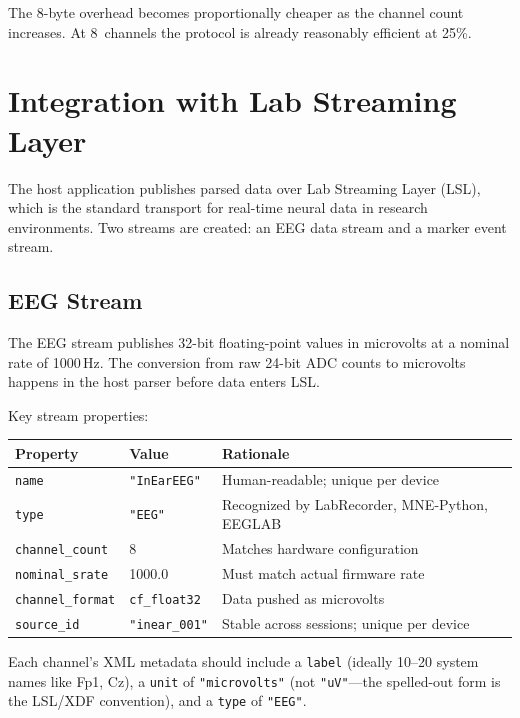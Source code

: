 \documentclass[11pt,a4paper]{article}
\begin{document}
The 8-byte overhead becomes proportionally cheaper as the channel count increases.  At 8~channels the protocol is already reasonably efficient at 25\%.

\section{Integration with Lab Streaming Layer}
\label{sec:lsl}

The host application publishes parsed data over Lab Streaming Layer (LSL), which is the standard transport for real-time neural data in research environments.  Two streams are created: an EEG data stream and a marker event stream.

\subsection{EEG Stream}

The EEG stream publishes 32-bit floating-point values in microvolts at a nominal rate of 1000\,Hz.  The conversion from raw 24-bit ADC counts to microvolts happens in the host parser before data enters LSL.

Key stream properties:

\medskip
\begin{tabular}{lll}
\toprule
\textbf{Property} & \textbf{Value} & \textbf{Rationale} \\
\midrule
\texttt{name}            & \texttt{"InEarEEG"}       & Human-readable; unique per device \\
\texttt{type}            & \texttt{"EEG"}             & Recognized by LabRecorder, MNE-Python, EEGLAB \\
\texttt{channel\_count}  & 8                          & Matches hardware configuration \\
\texttt{nominal\_srate}  & 1000.0                     & Must match actual firmware rate \\
\texttt{channel\_format}  & \texttt{cf\_float32}       & Data pushed as microvolts \\
\texttt{source\_id}      & \texttt{"inear\_001"}      & Stable across sessions; unique per device \\
\bottomrule
\end{tabular}
\medskip

Each channel's XML metadata should include a \texttt{label} (ideally 10--20 system names like Fp1, Cz), a \texttt{unit} of \texttt{"microvolts"} (not \texttt{"uV"}---the spelled-out form is the LSL/XDF convention), and a \texttt{type} of \texttt{"EEG"}.
\end{document}
